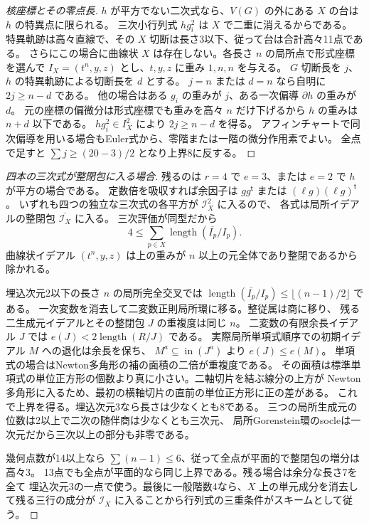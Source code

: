 \begin{proof}[核座標とその零点長]
$h$ が平方でない二次式なら、$V(G)$ の外にある $X$ の台は $h$ の特異点に限られる。
三次小行列式 $hg_i^2$ は $X$ で二重に消えるからである。
特異軌跡は高々直線で、その $X$ 切断は長さ3以下、従って台は合計高々11点である。
さらにこの場合に曲線状 $X$ は存在しない。各長さ $n$ の局所点で形式座標を選んで
$I_X=(t^n,y,z)$ とし、$t,y,z$ に重み $1,n,n$ を与える。
$G$ 切断長を $j$、$h$ の特異軌跡による切断長を $d$ とする。
$j=n$ または $d=n$ なら自明に $2j\ge n-d$ である。
他の場合はある $g_i$ の重みが $j$、ある一次偏導 $\partial h$ の重みが $d$。
元の座標の偏微分は形式座標でも重みを高々 $n$ だけ下げるから $h$ の重みは $n+d$ 以下である。
$hg_i^2\in I_X^2$ により $2j\ge n-d$ を得る。
アフィンチャートで同次偏導を用いる場合もEuler式から、零階または一階の微分作用素でよい。
全点で足すと $\sum j\ge(20-3)/2$ となり上界8に反する。
\end{proof}

\begin{proof}[四本の三次式が整閉包に入る場合]
残るのは $r=4$ で $e=3$、または $e=2$ で $h$ が平方の場合である。
定数倍を吸収すれば余因子は $gg^{\mathsf t}$ または $(\ell g)(\ell g)^{\mathsf t}$。
いずれも四つの独立な三次式の各平方が $\mathcal I_X^2$ に入るので、
各式は局所イデアルの整閉包 $\overline{\mathcal I_X}$ に入る。
三次評価が同型だから
\[
  4\le\sum_{p\in X}\operatorname{length}(\overline{I_p}/I_p).
\]
曲線状イデアル $(t^n,y,z)$ は上の重みが $n$ 以上の元全体であり整閉であるから除かれる。

埋込次元2以下の長さ $n$ の局所完全交叉では
$\operatorname{length}(\overline{I_p}/I_p)\le\lfloor(n-1)/2\rfloor$ である。
一次変数を消去して二変数正則局所環に移る。整従属は商に移り、
残る二生成元イデアルとその整閉包 $J$ の重複度は同じ $n$。
二変数の有限余長イデアル $J$ では $e(J)<2\operatorname{length}(R/J)$ である。
実際局所単項式順序での初期イデアル $M$ への退化は余長を保ち、
$M^a\subseteq\operatorname{in}(J^a)$ より $e(J)\le e(M)$。
単項式の場合はNewton多角形の補の面積の二倍が重複度である。
その面積は標準単項式の単位正方形の個数より真に小さい。二軸切片を結ぶ線分の上方が
Newton多角形に入るため、最初の横軸切片の直前の単位正方形に正の差がある。
これで上界を得る。埋込次元3なら長さは少なくとも8である。
三つの局所生成元の位数は2以上で二次の随伴商は少なくとも三次元、
局所Gorenstein環のsocleは一次元だから三次以上の部分も非零である。

幾何点数が14以上なら $\sum(n-1)\le6$、従って全点が平面的で整閉包の増分は高々3。
13点でも全点が平面的なら同じ上界である。残る場合は余分な長さ7を全て
埋込次元3の一点で使う。最後に一般階数4なら、$X$ 上の単元成分を消去して残る三行の成分が
$\mathcal I_X$ に入ることから行列式の三重条件がスキームとして従う。
\end{proof}
